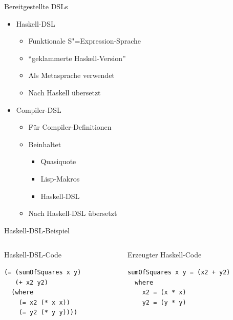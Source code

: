 \documentclass{beamer}
\newcommand{\sexp}{S"=Expression}
\begin{document}
\begin{frame}{Bereitgestellte DSLs}
  \begin{itemize}
  \item Haskell-DSL
    \begin{itemize}
    \item Funktionale \sexp{}-Sprache
    \item ``geklammerte Haskell-Version''
    \item Als Metasprache verwendet
    \item Nach Haskell übersetzt
    \end{itemize}
  \item Compiler-DSL
    \begin{itemize}
    \item Für Compiler-Definitionen
    \item Beinhaltet
      \begin{itemize}
      \item Quasiquote
      \item Lisp-Makros
      \item Haskell-DSL
      \end{itemize}
    \item Nach Haskell-DSL übersetzt
    \end{itemize}      
  \end{itemize}
\end{frame}

\begin{frame}[fragile]{Haskell-DSL-Beispiel}
  \begin{columns}
    \begin{column}{5cm}
      \begin{block}{Haskell-DSL-Code}
\begin{verbatim}
(= (sumOfSquares x y)
   (+ x2 y2)
  (where
    (= x2 (* x x))
    (= y2 (* y y))))  
\end{verbatim}
      \end{block}
    \end{column}
    \begin{column}{6cm}
      \begin{block}{Erzeugter Haskell-Code}
\begin{verbatim}
sumOfSquares x y = (x2 + y2)
  where
    x2 = (x * x)            
    y2 = (y * y)
\end{verbatim}
      \end{block}
    \end{column}
  \end{columns}
\end{frame}
\end{document}
